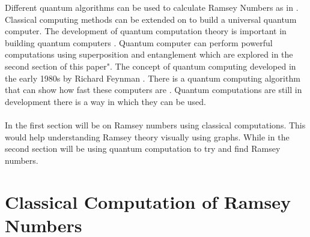 \documentclass[15pt, a4paper]{Assignment}
\begin{document}
Different quantum algorithms can be used to calculate Ramsey Numbers as in \cite{gaitan2012ramsey, PhysRevA.93.032301}.
Classical computing methods can be extended on to build a universal quantum computer.
The development of quantum computation theory is important in building quantum computers \cite{Deutsch1989}.
Quantum computer can perform powerful computations using superposition and entanglement which are explored in the second section of this paper".
The concept of quantum computing developed in the early 1980s by Richard Feynman  \cite{feynman1982simulating}. 
There is a quantum computing algorithm that can show how fast these computers are	\cite{doi:10.1137/S0097539796298637}. 
Quantum computations are still in development there is a way in which they can be used.
\\\\
In the first section will be on Ramsey numbers using classical computations. 
This would help understanding Ramsey theory visually using graphs.
While in the second section will be using quantum computation to try and find Ramsey numbers.
\section{Classical Computation of Ramsey Numbers}
\end{document}
